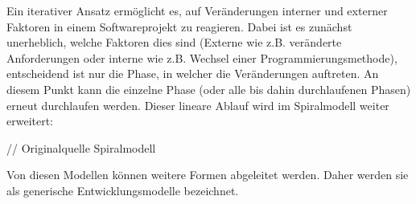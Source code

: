 Ein iterativer Ansatz ermöglicht es, auf Veränderungen interner und externer Faktoren in einem Softwareprojekt zu reagieren. Dabei ist es zunächst unerheblich, welche Faktoren dies sind (Externe wie z.B. veränderte Anforderungen oder interne wie z.B. Wechsel einer Programmierungsmethode), entscheidend ist nur die Phase, in welcher die Veränderungen auftreten. An diesem Punkt kann die einzelne Phase (oder alle bis dahin durchlaufenen Phasen) erneut durchlaufen werden.
Dieser lineare Ablauf wird im Spiralmodell weiter erweitert:

// Originalquelle Spiralmodell
\cite[Abb. 2]{boehm_spiral_1988} 

Von diesen Modellen können weitere Formen abgeleitet werden. Daher werden sie als generische Entwicklungsmodelle bezeichnet.
